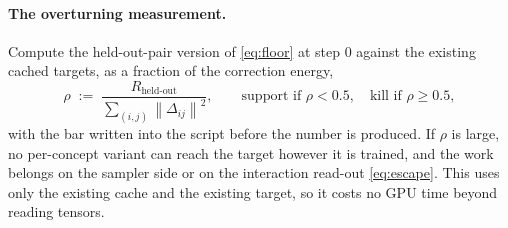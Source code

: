 \documentclass[11pt]{article}
\newcommand{\norm}[1]{\left\lVert #1 \right\rVert}
\theoremstyle{plain}
\theoremstyle{remark}
\begin{document}
\paragraph{The overturning measurement.}
Compute the held-out-pair version of \eqref{eq:floor} at step 0 against the existing cached
targets, as a fraction of the correction energy,
\begin{equation}
  \rho \;:=\; \frac{R_{\text{held-out}}}{\sum_{(i,j)} \norm{\Delta_{ij}}^2},
  \qquad
  \text{support if } \rho < 0.5,\quad \text{kill if } \rho \ge 0.5,
  \label{eq:bar}
\end{equation}
with the bar written into the script before the number is produced. If $\rho$ is large, no
per-concept variant can reach the target however it is trained, and the work belongs on the
sampler side or on the interaction read-out \eqref{eq:escape}. This uses only the existing
cache and the existing target, so it costs no GPU time beyond reading tensors.
\end{document}
